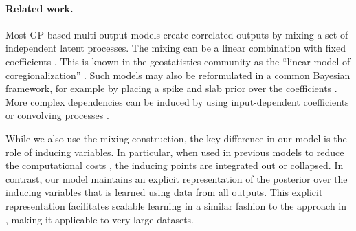 
\paragraph{Related work.}
Most GP-based multi-output models create correlated outputs by mixing a set of independent latent processes.
The mixing can be a linear combination with fixed coefficients \citep[see e.g.][]{teh-et-al-aistats-05,bonilla-et-al-nips-08}. This is known in the geostatistics community as  the ``linear model of coregionalization'' \citep{goovaerts1997geostatistics}.
Such models may also be reformulated in a common Bayesian framework, for example by placing a spike and slab prior over the coefficients \citep{titsias2011spike}.
More complex dependencies can be induced by using 
 input-dependent coefficients \citep{wilson-et-al-icml-12,nguyen2013efficient}  or convolving processes \citep{boyle-frean-nips-05,alvarez-lawrence-nips-08,alvarez2010efficient}.
 
While we also use the mixing construction, the key difference in our model is the role of inducing variables.
In particular, when used in previous models to reduce the computational costs \citep[see e.g.][]{alvarez-lawrence-nips-08,alvarez2010efficient}, the inducing points are integrated out or collapsed. 
In contrast, our model maintains an explicit representation of the posterior over the inducing variables that is learned using data from all outputs.
This explicit representation  facilitates scalable learning in a similar fashion to 
the approach in \citet{hensmangaussian}, making it applicable to very large datasets. 











